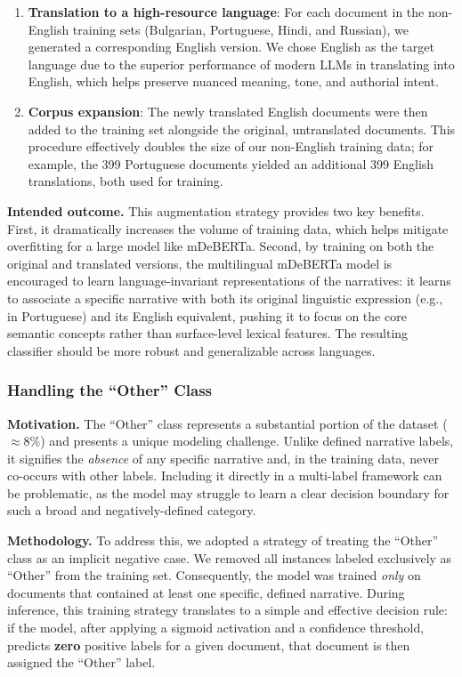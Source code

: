 \begin{enumerate}
	\item \textbf{Translation to a high-resource language}: For each document in the non-English training sets (Bulgarian, Portuguese, Hindi, and Russian), we generated a corresponding English version. We chose English as the target language due to the superior performance of modern LLMs in translating into English, which helps preserve nuanced meaning, tone, and authorial intent.
	\item \textbf{Corpus expansion}: The newly translated English documents were then added to the training set alongside the original, untranslated documents. This procedure effectively doubles the size of our non-English training data; for example, the 399 Portuguese documents yielded an additional 399 English translations, both used for training.
\end{enumerate}

\medskip
\noindent\textbf{Intended outcome.} This augmentation strategy provides two key benefits. First, it dramatically increases the volume of training data, which helps mitigate overfitting for a large model like mDeBERTa. Second, by training on both the original and translated versions, the multilingual mDeBERTa model is encouraged to learn language-invariant representations of the narratives: it learns to associate a specific narrative with both its original linguistic expression (e.g., in Portuguese) and its English equivalent, pushing it to focus on the core semantic concepts rather than surface-level lexical features. The resulting classifier should be more robust and generalizable across languages.

\subsubsection{Handling the ``Other'' Class}

\noindent\textbf{Motivation.} The ``Other'' class represents a substantial portion of the dataset (\(\approx 8\%\)) and presents a unique modeling challenge. Unlike defined narrative labels, it signifies the \emph{absence} of any specific narrative and, in the training data, never co-occurs with other labels. Including it directly in a multi-label framework can be problematic, as the model may struggle to learn a clear decision boundary for such a broad and negatively-defined category.

\medskip
\noindent\textbf{Methodology.} To address this, we adopted a strategy of treating the ``Other'' class as an implicit negative case. We removed all instances labeled exclusively as ``Other'' from the training set. Consequently, the model was trained \emph{only} on documents that contained at least one specific, defined narrative. During inference, this training strategy translates to a simple and effective decision rule: if the model, after applying a sigmoid activation and a confidence threshold, predicts \textbf{zero} positive labels for a given document, that document is then assigned the ``Other'' label.

